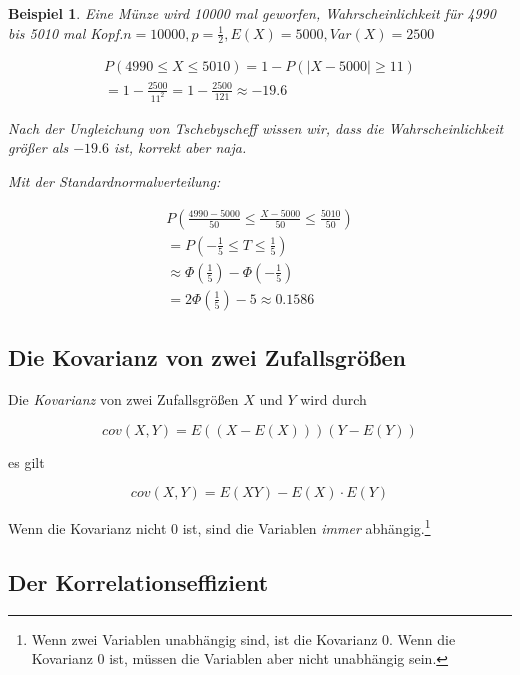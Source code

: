 \documentclass{tufte-handout}
\theoremstyle{own}
\newtheorem{example}{Beispiel}[]
\begin{document}
\begin{example}
	Eine Münze wird 10000 mal geworfen, Wahrscheinlichkeit für 4990 bis 5010 mal
	Kopf.$n=10000, p=\frac{1}{2}, E(X) = 5000, Var(X) = 2500$
	
	\begin{gather}
		P(4990 \le X \le 5010) = 1 - P(|X - 5000| \ge 11)\\
		= 1 - \frac{2500}{11^2} = 1 - \frac{2500}{121} \approx -19.6
	\end{gather}
	
	Nach der Ungleichung von Tschebyscheff wissen wir, dass die Wahrscheinlichkeit
	größer als $-19.6$ ist, korrekt aber naja.
	
	Mit der Standardnormalverteilung:
	
	\begin{gather*}
	P(\frac{4990 - 5000}{50} \le \frac{X - 5000}{50} \le \frac{5010}{50})\\
	= P(- \frac{1}{5} \le T \le \frac{1}{5}) \\
	\approx \Phi(\frac{1}{5}) - \Phi(-\frac{1}{5}) \\
	=2 \Phi(\frac{1}{5}) - 5 \approx 0.1586
	\end{gather*}
\end{example}

\subsection{Die Kovarianz von zwei Zufallsgrößen}

Die \emph{Kovarianz} von zwei Zufallsgrößen $X$ und $Y$ wird durch

\begin{equation}
	cov(X,Y) = E((X - E(X)))(Y - E(Y))
\end{equation}

es gilt

\begin{equation}
	cov(X,Y) = E(XY) - E(X) \cdot E(Y)
\end{equation}

Wenn die Kovarianz nicht 0 ist, sind die Variablen \emph{immer} abhängig.\footnote{
Wenn zwei Variablen unabhängig sind, ist die Kovarianz 0. Wenn die Kovarianz
0 ist, müssen die Variablen aber nicht unabhängig sein.}

\subsection{Der Korrelationseffizient}
\end{document}
